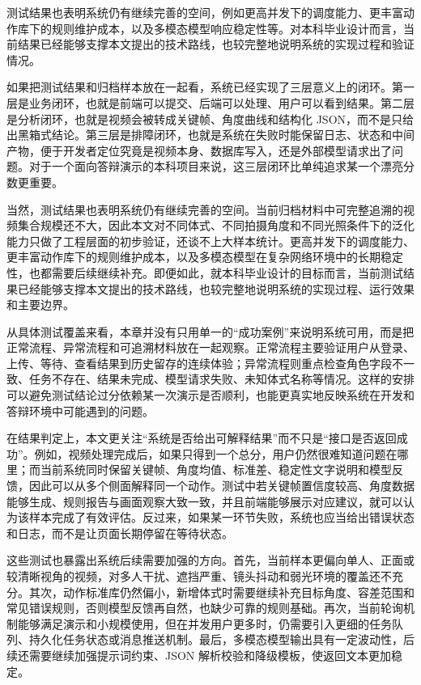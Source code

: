 \documentclass[UTF8,twoside]{ctexrep}
\makeatletter
\def@NAT@last@yr{\@citea}%
\def@NAT@last@yr{-\NAT@penalty}%
\makeatother
\begin{document}
测试结果也表明系统仍有继续完善的空间，例如更高并发下的调度能力、更丰富动作库下的规则维护成本，以及多模态模型响应稳定性等。对本科毕业设计而言，当前结果已经能够支撑本文提出的技术路线，也较完整地说明系统的实现过程和验证情况。

如果把测试结果和归档样本放在一起看，系统已经实现了三层意义上的闭环。第一层是业务闭环，也就是前端可以提交、后端可以处理、用户可以看到结果。第二层是分析闭环，也就是视频会被转成关键帧、角度曲线和结构化 JSON，而不是只给出黑箱式结论。第三层是排障闭环，也就是系统在失败时能保留日志、状态和中间产物，便于开发者定位究竟是视频本身、数据库写入，还是外部模型请求出了问题。对于一个面向答辩演示的本科项目来说，这三层闭环比单纯追求某一个漂亮分数更重要。

当然，测试结果也表明系统仍有继续完善的空间。当前归档材料中可完整追溯的视频集合规模还不大，因此本文对不同体式、不同拍摄角度和不同光照条件下的泛化能力只做了工程层面的初步验证，还谈不上大样本统计。更高并发下的调度能力、更丰富动作库下的规则维护成本，以及多模态模型在复杂网络环境中的长期稳定性，也都需要后续继续补充。即便如此，就本科毕业设计的目标而言，当前测试结果已经能够支撑本文提出的技术路线，也较完整地说明系统的实现过程、运行效果和主要边界。

从具体测试覆盖来看，本章并没有只用单一的“成功案例”来说明系统可用，而是把正常流程、异常流程和可追溯材料放在一起观察。正常流程主要验证用户从登录、上传、等待、查看结果到历史留存的连续体验；异常流程则重点检查角色字段不一致、任务不存在、结果未完成、模型请求失败、未知体式名称等情况。这样的安排可以避免测试结论过分依赖某一次演示是否顺利，也能更真实地反映系统在开发和答辩环境中可能遇到的问题。

在结果判定上，本文更关注“系统是否给出可解释结果”而不只是“接口是否返回成功”。例如，视频处理完成后，如果只得到一个总分，用户仍然很难知道问题在哪里；而当前系统同时保留关键帧、角度均值、标准差、稳定性文字说明和模型反馈，因此可以从多个侧面解释同一个动作。测试中若关键帧置信度较高、角度数据能够生成、规则报告与画面观察大致一致，并且前端能够展示对应建议，就可以认为该样本完成了有效评估。反过来，如果某一环节失败，系统也应当给出错误状态和日志，而不是让页面长期停留在等待状态。

这些测试也暴露出系统后续需要加强的方向。首先，当前样本更偏向单人、正面或较清晰视角的视频，对多人干扰、遮挡严重、镜头抖动和弱光环境的覆盖还不充分。其次，动作标准库仍然偏小，新增体式时需要继续补充目标角度、容差范围和常见错误规则，否则模型反馈再自然，也缺少可靠的规则基础。再次，当前轮询机制能够满足演示和小规模使用，但在并发用户更多时，仍需要引入更细的任务队列、持久化任务状态或消息推送机制。最后，多模态模型输出具有一定波动性，后续还需要继续加强提示词约束、JSON 解析校验和降级模板，使返回文本更加稳定。
\end{document}
